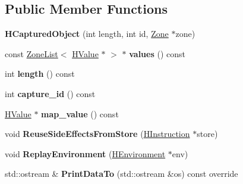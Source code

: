 \subsection*{Public Member Functions}
\begin{DoxyCompactItemize}
\item 
{\bfseries H\+Captured\+Object} (int length, int id, \hyperlink{classv8_1_1internal_1_1_zone}{Zone} $\ast$zone)\hypertarget{classv8_1_1internal_1_1_h_captured_object_a54410dcc6775026c1fba9b6ffcf8daa1}{}\label{classv8_1_1internal_1_1_h_captured_object_a54410dcc6775026c1fba9b6ffcf8daa1}

\item 
const \hyperlink{classv8_1_1internal_1_1_zone_list}{Zone\+List}$<$ \hyperlink{classv8_1_1internal_1_1_h_value}{H\+Value} $\ast$ $>$ $\ast$ {\bfseries values} () const \hypertarget{classv8_1_1internal_1_1_h_captured_object_a34b0fcc7020d16746c8b08e404bb9b8c}{}\label{classv8_1_1internal_1_1_h_captured_object_a34b0fcc7020d16746c8b08e404bb9b8c}

\item 
int {\bfseries length} () const \hypertarget{classv8_1_1internal_1_1_h_captured_object_a46daabcf430ff6c6308f15cb3decabcc}{}\label{classv8_1_1internal_1_1_h_captured_object_a46daabcf430ff6c6308f15cb3decabcc}

\item 
int {\bfseries capture\+\_\+id} () const \hypertarget{classv8_1_1internal_1_1_h_captured_object_aceffa3010bdcfcc702c4b124aa0d8a1e}{}\label{classv8_1_1internal_1_1_h_captured_object_aceffa3010bdcfcc702c4b124aa0d8a1e}

\item 
\hyperlink{classv8_1_1internal_1_1_h_value}{H\+Value} $\ast$ {\bfseries map\+\_\+value} () const \hypertarget{classv8_1_1internal_1_1_h_captured_object_ab60c4908f367fbb98b9cb979074975fa}{}\label{classv8_1_1internal_1_1_h_captured_object_ab60c4908f367fbb98b9cb979074975fa}

\item 
void {\bfseries Reuse\+Side\+Effects\+From\+Store} (\hyperlink{classv8_1_1internal_1_1_h_instruction}{H\+Instruction} $\ast$store)\hypertarget{classv8_1_1internal_1_1_h_captured_object_a6f8897cdbbdf3e6af18cd856b99b85a1}{}\label{classv8_1_1internal_1_1_h_captured_object_a6f8897cdbbdf3e6af18cd856b99b85a1}

\item 
void {\bfseries Replay\+Environment} (\hyperlink{classv8_1_1internal_1_1_h_environment}{H\+Environment} $\ast$env)\hypertarget{classv8_1_1internal_1_1_h_captured_object_aa51732487321ebd8d8a8eb24ed431952}{}\label{classv8_1_1internal_1_1_h_captured_object_aa51732487321ebd8d8a8eb24ed431952}

\item 
std\+::ostream \& {\bfseries Print\+Data\+To} (std\+::ostream \&os) const  override\hypertarget{classv8_1_1internal_1_1_h_captured_object_ab07c49a611c1cfb488cb2f075b7a1fbf}{}\label{classv8_1_1internal_1_1_h_captured_object_ab07c49a611c1cfb488cb2f075b7a1fbf}

\end{DoxyCompactItemize}
